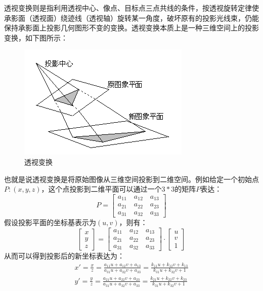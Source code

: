 透视变换则是指利用透视中心、像点、目标点三点共线的条件，按透视旋转定律使承影面（透视面）绕迹线（透视轴）旋转某一角度，破坏原有的投影光线束，仍能保持承影面上投影几何图形不变的变换。透视变换本质上是一种三维空间上的投影变换，如下图所示：
\begin{figure}[htb]
	\centering 
	\includegraphics[scale=1.0]{./mypic/透视变换.jpg} 
	\caption{透视变换} 
\end{figure}

也就是说透视变换是将原始图像从三维空间投影到二维空间。例如给定一个初始点$P:(x,y,z)$，这个点投影到二维平面可以通过一个$3*3$的矩阵$P$表达：
\begin{equation}
	P=
	\left[
	\begin{aligned}
	a_{11}\quad a_{12}\quad a_{13} \\
	a_{21}\quad a_{22}\quad a_{23} \\
	a_{31}\quad a_{32}\quad a_{33}
	\end{aligned}
	\right]
\end{equation}
假设投影平面的坐标基表示为$(u,v)$，则有：
\begin{equation}
	\left[
	\begin{aligned}
	x \\
	y \\
	z
	\end{aligned}
	\right]=
	\left[
	\begin{aligned}
	a_{11}\quad a_{12}\quad a_{13} \\
	a_{21}\quad a_{22}\quad a_{23} \\
	a_{31}\quad a_{32}\quad a_{33}
	\end{aligned}
	\right]\cdot
	\left[
	\begin{aligned}
	u \\
	v \\
	1
	\end{aligned}
	\right]
\end{equation}
从而可以得到投影后的新坐标表达为：
\begin{equation}
\begin{aligned}
	x'=\frac{x}{z}=\frac{a_{11}u+a_{12}v+a_{13}}{a_{31}u+a_{32}v+a_{33}}
		=\frac{k_{11}u+k_{12}v+k_{13}}{k_{31}u+k_{32}v+1} \\
	y'=\frac{y}{z}=\frac{a_{21}u+a_{22}v+a_{23}}{a_{31}u+a_{32}v+a_{33}}
		=\frac{k_{21}u+k_{22}v+k_{23}}{k_{31}u+k_{32}v+1}
\end{aligned}
\end{equation}

